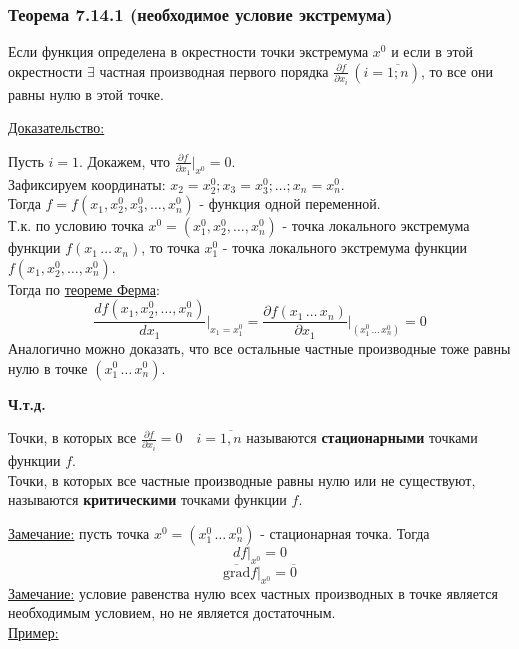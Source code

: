 \documentclass[12pt]{article}
\begin{document}
    \subsubsection*{Теорема 7.14.1 (необходимое условие экстремума)}\label{th:7.14.1}
    Если функция определена в окрестности точки экстремума $x^0$ и если в этой окрестности $\exists$ частная производная первого порядка $\frac{\partial f}{\partial x_i}\,(i = \overline{1;n})$, то все они равны нулю в этой точке.\par\noindent
    \underline{Доказательство:}
    \begin{adjustwidth}{1.5em}{1.5em}
        Пусть $i = 1$. Докажем, что $\frac{\partial f}{\partial x_1} \Big|_{x^0} = 0$.\\
        Зафиксируем координаты: $x_2 = x^0_2; x_3 = x^0_3; \dots; x_n = x^0_n$.\\
        Тогда $f = f(x_1, x^0_2, x^0_3, \dots, x^0_n)$ - функция одной переменной.\\
        Т.к. по условию точка $x^0 = (x^0_1, x^0_2, \dots, x^0_n)$ - точка локального экстремума функции $f(x_1\, \dots\, x_n)$, то точка $x^0_1$ - точка локального экстремума функции $f(x_1, x^0_2, \dots, x^0_n)$.\\
        Тогда по \hyperref[th:4.12.1]{теореме Ферма}:
        \[ \frac{df(x_1, x^0_2, \dots, x^0_n)}{dx_1} \Big|_{x_1 = x^0_1} = \frac{\partial f(x_1\, \dots\, x_n)}{\partial x_1} \Big|_{(x^0_1\, \dots\, x^0_n)} = 0 \]
        Аналогично можно доказать, что все остальные частные производные тоже равны нулю в точке $(x^0_1\, \dots\, x^0_n)$.
        \begin{center}
            \textbf{Ч.т.д.}
        \end{center}
    \end{adjustwidth}
    Точки, в которых все $\frac{\partial f}{\partial x_i} = 0 \quad i = \overline{1,n}$ называются \textbf{стационарными} точками функции $f$.\\
    Точки, в которых все частные производные равны нулю или не существуют, называются \textbf{критическими} точками функции $f$.\par\noindent
    \underline{Замечание:} пусть точка $x^0 = (x^0_1\, \dots\, x^0_n)$ - стационарная точка. Тогда
    \[ df \Big|_{x^0} = 0 \]
    \[ \overline{\text{grad}}f \Big|_{x^0} = \overline{0} \]
    \underline{Замечание:} условие равенства нулю всех частных производных в точке является необходимым условием, но не является достаточным.\\
    \underline{Пример:}
\end{document}
